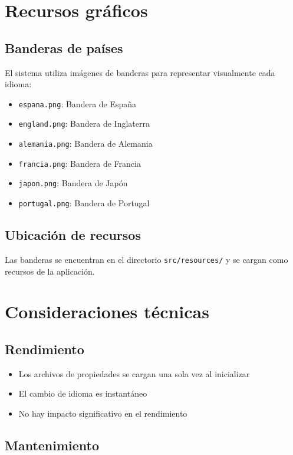 \section{Recursos gráficos}

\subsection{Banderas de países}

El sistema utiliza imágenes de banderas para representar visualmente cada idioma:

\begin{itemize}
    \item \texttt{espana.png}: Bandera de España
    \item \texttt{england.png}: Bandera de Inglaterra
    \item \texttt{alemania.png}: Bandera de Alemania
    \item \texttt{francia.png}: Bandera de Francia
    \item \texttt{japon.png}: Bandera de Japón
    \item \texttt{portugal.png}: Bandera de Portugal
\end{itemize}

\subsection{Ubicación de recursos}

Las banderas se encuentran en el directorio \texttt{src/resources/} y se cargan como recursos de la aplicación.

\section{Consideraciones técnicas}

\subsection{Rendimiento}

\begin{itemize}
    \item Los archivos de propiedades se cargan una sola vez al inicializar
    \item El cambio de idioma es instantáneo
    \item No hay impacto significativo en el rendimiento
\end{itemize}

\subsection{Mantenimiento}

